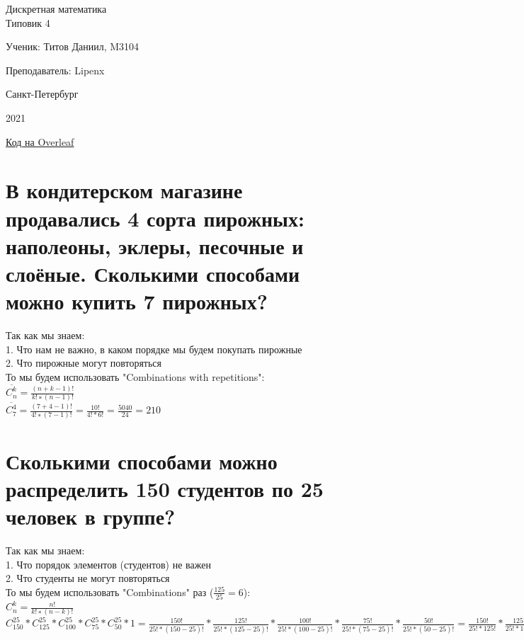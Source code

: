 \documentclass{article}
\begin{document}
    \begin{center}
        \hfill \break
        \LARGE{Дискретная математика}\\
        \hfill \break
        \Large{Типовик 4}\\
        \hfill \break
        \hfill \break
        \hfill \break
        \hfill \break
    \end{center}

    \begin{flushright} Ученик: Титов Даниил, M3104 \end{flushright}
    \begin{flushright} Преподаватель: Lipenx \end{flushright}
    \vfill
    \bigskip
    \begin{center} Санкт-Петербург \end{center}
    \begin{center} 2021 \end{center}
    \thispagestyle{empty}
    \newpage
    \tableofcontents{}
    \vfill
    \bigskip
    \begin{flushright}
        \href{https://ru.overleaf.com/read/cxvppkhfjptr}{Код на Overleaf}
    \end{flushright}
    \newpage
    \section{В кондитерском магазине продавались 4 сорта пирожных: наполеоны, эклеры, песочные и слоёные. Сколькими способами можно купить 7 пирожных?}
        Так как мы знаем:\\
        1. Что нам не важно, в каком порядке мы будем покупать пирожные\\
        2. Что пирожные могут повторяться\\
        То мы будем использовать "Combinations with repetitions":\\
        $ \overline{C^k_n} = \frac{(n+k-1)!}{k!∗(n-1)!} $\\
        $ \overline{C^4_7} = \frac{(7+4-1)!}{4!∗(7-1)!} = \frac{10!}{4!*6!} = \frac{5040}{24} = 210 $
    \section{Сколькими способами можно распределить 150 студентов по 25 человек в группе?}
        Так как мы знаем:\\
        1. Что порядок элементов (студентов) не важен\\
        2. Что студенты не могут повторяться\\
        То мы будем использовать "Combinations" раз ($ \frac{125}{25} = 6 $):\\
        $ C^k_n = \frac{n!}{k!∗(n-k)!} $\\
        $ C^{25}_{150} * C^{25}_{125} * C^{25}_{100} * C^{25}_{75} * C^{25}_{50} * 1 = \frac{150!}{25!*(150-25)!} * \frac{125!}{25!*(125-25)!} * \frac{100!}{25!*(100-25)!} * \frac{75!}{25!*(75-25)!} * \frac{50!}{25!*(50-25)!} = \frac{150!}{25!*125!} * \frac{125!}{25!*100!} * \frac{100!}{25!*75!} * \frac{75!}{25!*50!} * \frac{50!}{25!*25!} $
\end{document}
